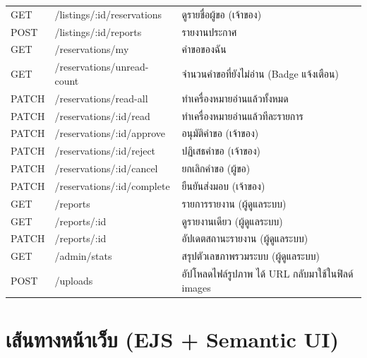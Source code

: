 \documentclass[12pt,a4paper]{report}
\begin{document}
\begin{longtable}{l l p{6.2cm}}
GET & /listings/:id/reservations & ดูรายชื่อผู้ขอ (เจ้าของ)\\
POST & /listings/:id/reports & รายงานประกาศ\\
GET & /reservations/my & คำขอของฉัน\\
GET & /reservations/unread-count & จำนวนคำขอที่ยังไม่อ่าน (Badge แจ้งเตือน)\\
PATCH & /reservations/read-all & ทำเครื่องหมายอ่านแล้วทั้งหมด\\
PATCH & /reservations/:id/read & ทำเครื่องหมายอ่านแล้วทีละรายการ\\
PATCH & /reservations/:id/approve & อนุมัติคำขอ (เจ้าของ)\\
PATCH & /reservations/:id/reject & ปฏิเสธคำขอ (เจ้าของ)\\
PATCH & /reservations/:id/cancel & ยกเลิกคำขอ (ผู้ขอ)\\
PATCH & /reservations/:id/complete & ยืนยันส่งมอบ (เจ้าของ)\\
GET & /reports & รายการรายงาน (ผู้ดูแลระบบ)\\
GET & /reports/:id & ดูรายงานเดียว (ผู้ดูแลระบบ)\\
PATCH & /reports/:id & อัปเดตสถานะรายงาน (ผู้ดูแลระบบ)\\
GET & /admin/stats & สรุปตัวเลขภาพรวมระบบ (ผู้ดูแลระบบ)\\
POST & /uploads & อัปโหลดไฟล์รูปภาพ ได้ URL กลับมาใช้ในฟิลด์ images\\
\end{longtable}

\section*{เส้นทางหน้าเว็บ (EJS + Semantic UI)}
\end{document}
